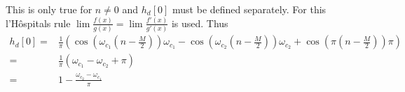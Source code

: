 This is only true for $n \neq 0$ and $h_d[0]$ must be defined separately. For this l'Hôspitals rule $\lim \frac{f(x)}{g(x)}=\lim \frac{f'(x)}{g'(x)}$ is used. Thus
\begin{align*}
h_d[0]=& \frac{1}{\pi} \left( \cos\left( \omega_{c_1} \left(n-\frac{M}{2}\right) \right)\omega_{c_1} - \cos\left( \omega_{c_2} \left(n-\frac{M}{2}\right) \right)\omega_{c_2} +  \cos\left(\pi \left( n- \frac{M}{2}\right) \right) \pi \right) \\
=& \frac{1}{\pi}\left( \omega_{c_1} - \omega_{c_2} + \pi \right) \\
=& 1 - \frac{\omega_{c_2}-\omega_{c_1}}{\pi}
\end{align*}
 
 